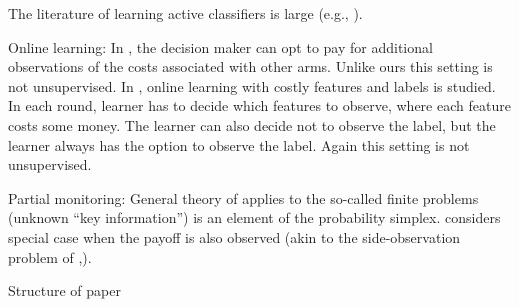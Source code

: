 The literature of learning active classifiers is large 
(e.g., \citep{LCunderBudget-ECML05,ADORE-99,isukapalli01efficient-ICJAI}).


Online learning: In 
\cite{SBCA14:BanditsPaid}, the decision maker can opt to pay for additional observations of the costs associated with other arms. Unlike ours this setting is not unsupervised. In
\citet{ZBGGySz13:CostlyFeatures}, online learning with costly features and labels is studied.
In each round, learner has to decide which features to observe, where each feature costs some money. The learner can also decide not to observe the label, but the learner always has the option
to observe the label. Again this setting is not unsupervised.

Partial monitoring:
General theory of \citet{BaFoPaRaSze14} 
applies to the so-called finite problems (unknown ``key information'') is an element of the probability simplex.
\citet{AgTeAn89:pmon} considers special case when the payoff is also observed (akin to the side-observation problem of \citet{MaSh11}\cite{COLT15_OnlineLearningWithFeedback_AlonBianchiDekel},\cite{NIPS13_FromBanditsToExperts_AlonBianchiGentile}).

Structure of paper
